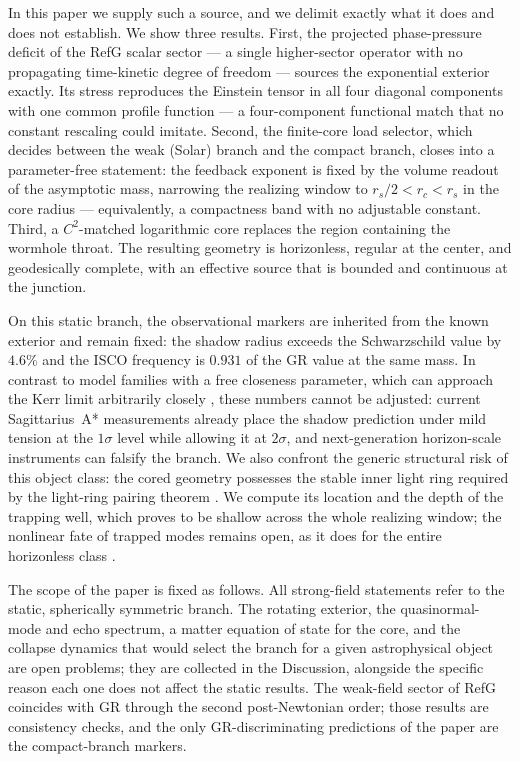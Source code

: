 \documentclass[12pt,a4paper]{article}
\begin{document}
In this paper we supply such a source, and we delimit exactly what it does
and does not establish. We show three results. First, the projected
phase-pressure deficit of the RefG scalar sector --- a single higher-sector
operator with no propagating time-kinetic degree of freedom --- sources the
exponential exterior exactly. Its stress reproduces the Einstein tensor in all
four diagonal components with one common profile function --- a four-component
functional match that no constant rescaling could imitate. Second, the
finite-core load selector, which decides between the weak (Solar) branch and
the compact branch, closes into a parameter-free statement: the feedback
exponent is fixed by the volume readout of the asymptotic mass, narrowing the
realizing window to $r_s/2<r_c<r_s$ in the core radius --- equivalently, a
compactness band with no adjustable constant. Third, a $C^2$-matched
logarithmic core replaces the region containing the wormhole throat. The
resulting geometry is horizonless, regular at the center, and geodesically
complete, with an effective source that is bounded and continuous at the
junction.

On this static branch, the observational markers are inherited from the known
exterior and remain fixed: the shadow radius exceeds the Schwarzschild value by
$4.6\%$ and the ISCO frequency is $0.931$ of the GR value at the same mass.
In contrast to model families with a free closeness parameter, which can
approach the Kerr limit arbitrarily closely \cite{CardosoPani2019}, these
numbers cannot be adjusted: current Sagittarius~A*
measurements already place the shadow prediction under mild tension at the
$1\sigma$ level while allowing it at $2\sigma$, and next-generation
horizon-scale instruments can falsify the branch. We also confront
the generic structural risk of this object class: the cored geometry
possesses the stable inner light ring required by the light-ring pairing
theorem \cite{CunhaBertiHerdeiro2017}. We compute its location and the depth
of the trapping well, which proves to be shallow across the whole realizing
window; the nonlinear fate of trapped modes remains open, as it does for the
entire horizonless class \cite{CunhaEtAl2023}.

The scope of the paper is fixed as follows. All strong-field statements
refer to the static, spherically symmetric branch. The rotating exterior, the
quasinormal-mode and echo spectrum, a matter equation of state for the core,
and the collapse dynamics that would select the branch for a given
astrophysical object are open problems; they are collected in the Discussion,
alongside the specific reason each one does not affect the static results. The
weak-field sector of RefG coincides with GR through the second post-Newtonian
order; those results are consistency checks, and the only GR-discriminating
predictions of the paper are the compact-branch markers.
\end{document}
